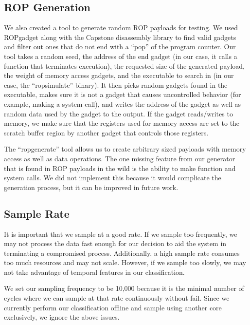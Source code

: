 \documentclass[letterpaper,twocolumn,10pt]{article}
\begin{document}
\subsection*{ROP Generation}

We also created a tool to generate random ROP payloads for testing. We used ROPgadget\cite{ROPgadget} along with the 
Capstone\cite{Capstone} disassembly library to find valid gadgets and filter out ones that do not end with a ``pop'' of 
the program counter. Our tool takes a random seed, the address of the end gadget (in our case, it calls a function 
that terminates execution), the requested size of the generated payload, the weight of memory access gadgets, and 
the executable to search in (in our case, the ``ropsimulate'' binary). It then picks random gadgets found in the 
executable, makes sure it is not a gadget that causes uncontrolled behavior (for example, making a system call), and 
writes the address of the gadget as well as random data used by the gadget to the output. If the gadget reads/writes 
to memory, we make sure that the registers used for memory access are set to the scratch buffer region by another 
gadget that controls those registers.

The ``ropgenerate'' tool allows us to create arbitrary sized payloads with memory access as well as data operations. 
The one missing feature from our generator that is found in ROP payloads in the wild is the ability to make function 
and system calls. We did not implement this because it would complicate the generation process, but it can be improved 
in future work.

\subsection*{Sample Rate}

It is important that we sample at a good rate. If we sample too frequently, we may not process 
the data fast enough for our decision to aid the system in terminating a compromised process. 
Additionally, a high sample rate consumes too much resources and may not scale. However, if 
we sample too slowly, we may not take advantage of temporal features in our classification.

We set our sampling frequency to be 10,000 because it is the minimal number of cycles where we can sample at that rate continuously without fail. Since we currently perform our classification offline and sample using another core exclusively, we ignore the above issues.
\end{document}
